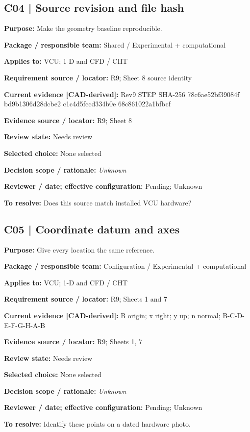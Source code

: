\documentclass[11pt]{article}
\begin{document}
\begin{minipage}{\textwidth}\small\setlength{\parskip}{2pt}
\subsection*{C04 | Source revision and file hash}
\textbf{Purpose:} Make the geometry baseline reproducible.\par
\textbf{Package / responsible team:} Shared / Experimental + computational\par
\textbf{Applies to:} VCU; 1-D and CFD / CHT\par
\textbf{Requirement source / locator:} R9; Sheet 8 source identity\par
\textbf{Current evidence [CAD-derived]:} Rev9 STEP SHA-256 78c6ae52bf39084f bd9b1306d28dcbe2 c1c4d5fccd334b0e 68c861022a1bfbcf\par
\textbf{Evidence source / locator:} R9; Sheet 8\par
\textbf{Review state:} Needs review\par
\textbf{Selected choice:} None selected\par
\textbf{Decision scope / rationale:} \textit{Unknown}\par
\textbf{Reviewer / date; effective configuration:} Pending; Unknown\par
\textbf{To resolve:} Does this source match installed VCU hardware?\par
\end{minipage}\par\vspace{5pt}
\begin{minipage}{\textwidth}\small\setlength{\parskip}{2pt}
\subsection*{C05 | Coordinate datum and axes}
\textbf{Purpose:} Give every location the same reference.\par
\textbf{Package / responsible team:} Configuration / Experimental + computational\par
\textbf{Applies to:} VCU; 1-D and CFD / CHT\par
\textbf{Requirement source / locator:} R9; Sheets 1 and 7\par
\textbf{Current evidence [CAD-derived]:} B origin; x right; y up; n normal; B-C-D-E-F-G-H-A-B\par
\textbf{Evidence source / locator:} R9; Sheets 1, 7\par
\textbf{Review state:} Needs review\par
\textbf{Selected choice:} None selected\par
\textbf{Decision scope / rationale:} \textit{Unknown}\par
\textbf{Reviewer / date; effective configuration:} Pending; Unknown\par
\textbf{To resolve:} Identify these points on a dated hardware photo.\par
\end{minipage}\par\vspace{5pt}
\end{document}
